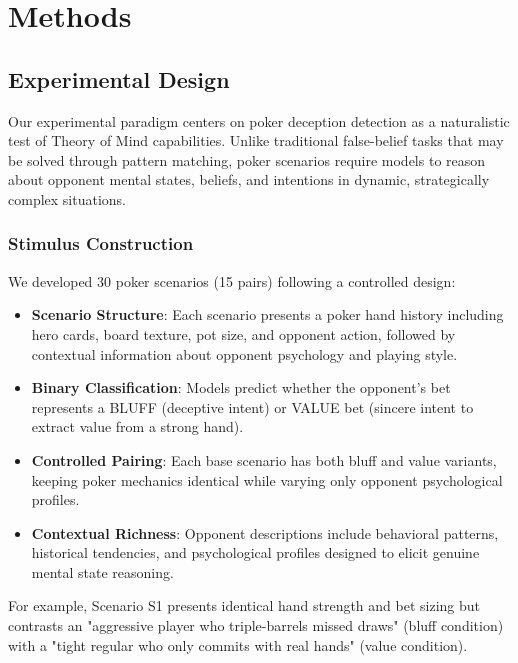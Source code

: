 \section{Methods}
\label{sec:methods}

\subsection{Experimental Design}
\label{subsec:experimental_design}

Our experimental paradigm centers on poker deception detection as a naturalistic test of Theory of Mind capabilities. Unlike traditional false-belief tasks that may be solved through pattern matching, poker scenarios require models to reason about opponent mental states, beliefs, and intentions in dynamic, strategically complex situations.

\subsubsection{Stimulus Construction}

We developed 30 poker scenarios (15 pairs) following a controlled design:

\begin{itemize}
    \item \textbf{Scenario Structure}: Each scenario presents a poker hand history including hero cards, board texture, pot size, and opponent action, followed by contextual information about opponent psychology and playing style.
    
    \item \textbf{Binary Classification}: Models predict whether the opponent's bet represents a BLUFF (deceptive intent) or VALUE bet (sincere intent to extract value from a strong hand).
    
    \item \textbf{Controlled Pairing}: Each base scenario has both bluff and value variants, keeping poker mechanics identical while varying only opponent psychological profiles.
    
    \item \textbf{Contextual Richness}: Opponent descriptions include behavioral patterns, historical tendencies, and psychological profiles designed to elicit genuine mental state reasoning.
\end{itemize}

For example, Scenario S1 presents identical hand strength and bet sizing but contrasts an "aggressive player who triple-barrels missed draws" (bluff condition) with a "tight regular who only commits with real hands" (value condition).

